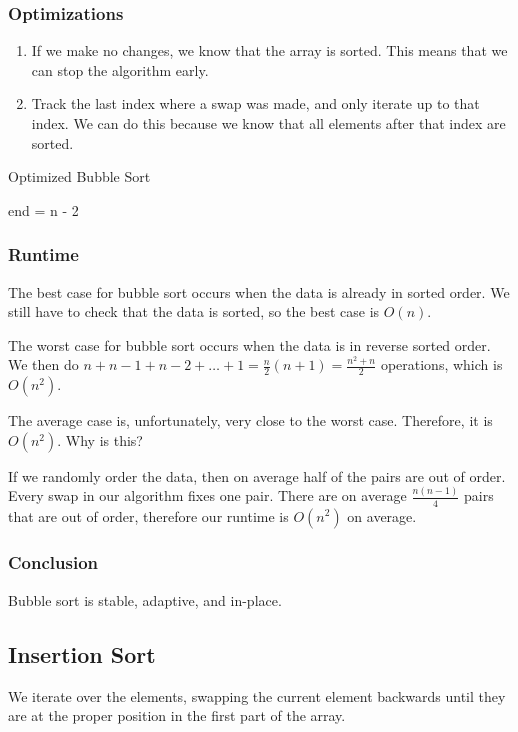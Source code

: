 \documentclass[a4paper]{article}
\begin{document}
\subsubsection{Optimizations}
\begin{enumerate}
	\item If we make no changes, we know that the array is sorted. This means that we can stop the algorithm early.
	\item Track the last index where a swap was made, and only iterate up to that index. We can do this because we know that all elements after that index are sorted.
\end{enumerate}

\begin{algorithm}
	\caption{Optimized Bubble Sort}
	end = n - 2\;
\end{algorithm}

\subsubsection{Runtime}
The best case for bubble sort occurs when the data is already in sorted order. We still have to check that the data is sorted, so the best case is \( O(n) \).

The worst case for bubble sort occurs when the data is in reverse sorted order. We then do \( n + n - 1 + n - 2 + \ldots + 1 = \frac{n}{2}(n+1) = \frac{n^2 + n}{2}\) operations, which is \( O(n^2) \).

The average case is, unfortunately, very close to the worst case. Therefore, it is \( O(n^2) \). Why is this?

If we randomly order the data, then on average half of the pairs are out of order. Every swap in our algorithm fixes one pair. There are on average \( \frac{n(n-1)}{4} \) pairs that are out of order, therefore our runtime is \( O(n^2) \) on average.

\subsubsection{Conclusion}
Bubble sort is stable, adaptive, and in-place.

\subsection{Insertion Sort}
We iterate over the elements, swapping the current element backwards until they are at the proper position in the first part of the array.
\end{document}
